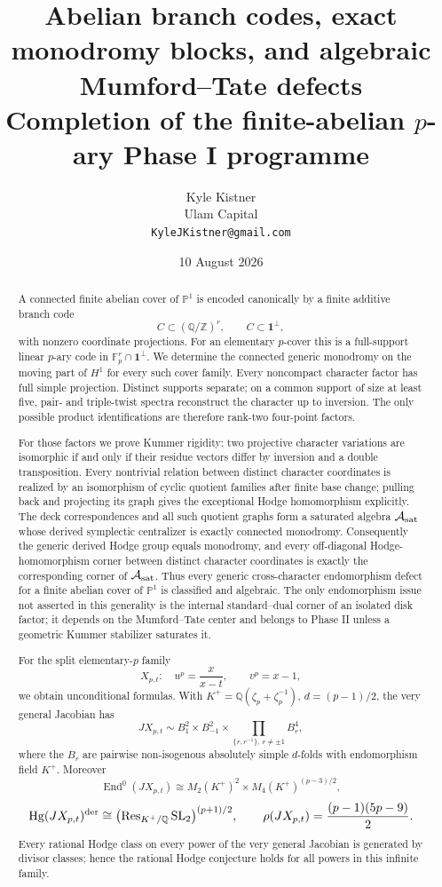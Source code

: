 \documentclass[11pt]{article}
\title{\vspace{-1.35em}\textbf{Abelian branch codes, exact monodromy blocks,\vspace{0.08em} and algebraic Mumford--Tate defects}\vspace{0.15em}\\
\large Completion of the finite-abelian $p$-ary Phase I programme}
\author{Kyle Kistner\\\small Ulam Capital\\\small \texttt{KyleJKistner@gmail.com}}
\date{10 August 2026}
\theoremstyle{definition}
\theoremstyle{remark}
\newcommand{\Q}{\mathbb Q}
\newcommand{\Z}{\mathbb Z}
\newcommand{\F}{\mathbb F}
\newcommand{\PP}{\mathbb P}
\newcommand{\Hg}{\operatorname{Hg}}
\newcommand{\End}{\operatorname{End}}
\newcommand{\Res}{\operatorname{Res}}
\newcommand{\one}{\mathbf 1}
\begin{document}
\maketitle
\vspace{-1.0em}

\begin{abstract}
A connected finite abelian cover of $\PP^1$ is encoded canonically by a finite additive branch code
\[
 C\subset (\Q/\Z)^r,\qquad C\subset\one^\perp,
\]
with nonzero coordinate projections.  For an elementary $p$-cover this is a full-support linear $p$-ary code in $\F_p^r\cap\one^\perp$.  We determine the connected generic monodromy on the moving part of $H^1$ for every such cover family.  Every noncompact character factor has full simple projection.  Distinct supports separate; on a common support of size at least five, pair- and triple-twist spectra reconstruct the character up to inversion.  The only possible product identifications are therefore rank-two four-point factors.

For those factors we prove Kummer rigidity: two projective character variations are isomorphic if and only if their residue vectors differ by inversion and a double transposition.  Every nontrivial relation between distinct character coordinates is realized by an isomorphism of cyclic quotient families after finite base change; pulling back and projecting its graph gives the exceptional Hodge homomorphism explicitly.  The deck correspondences and all such quotient graphs form a saturated algebra $\mathcal A_{\rm sat}$ whose derived symplectic centralizer is exactly connected monodromy.  Consequently the generic derived Hodge group equals monodromy, and every off-diagonal Hodge-homomorphism corner between distinct character coordinates is exactly the corresponding corner of $\mathcal A_{\rm sat}$.  Thus every generic cross-character endomorphism defect for a finite abelian cover of $\PP^1$ is classified and algebraic.  The only endomorphism issue not asserted in this generality is the internal standard--dual corner of an isolated disk factor; it depends on the Mumford--Tate center and belongs to Phase II unless a geometric Kummer stabilizer saturates it.

For the split elementary-$p$ family
\[
 X_{p,t}:\quad u^p=\frac{x}{x-t},\qquad v^p=x-1,
\]
we obtain unconditional formulas.  With $K^+=\Q(\zeta_p+\zeta_p^{-1})$, $d=(p-1)/2$, the very general Jacobian has
\[
 JX_{p,t}\sim B_1^2\times B_{-1}^2\times
 \prod_{\{r,r^{-1}\},\ r\ne\pm1} B_r^4,
\]
where the $B_r$ are pairwise non-isogenous absolutely simple $d$-folds with endomorphism field $K^+$.  Moreover
\[
 \End^0(JX_{p,t})\cong M_2(K^+)^2\times M_4(K^+)^{(p-3)/2},
\]
\[
 \Hg(JX_{p,t})^{\rm der}\cong
 \bigl(\Res_{K^+/\Q}\mathrm{SL}_2\bigr)^{(p+1)/2},
 \qquad
 \rho(JX_{p,t})=\frac{(p-1)(5p-9)}2.
\]
Every rational Hodge class on every power of the very general Jacobian is generated by divisor classes; hence the rational Hodge conjecture holds for all powers in this infinite family.
\end{abstract}
\end{document}
